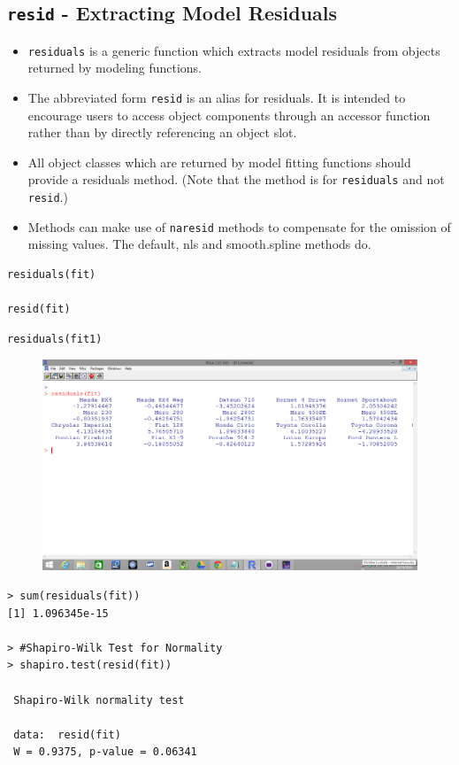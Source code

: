 \documentclass[residuals.tex]{subfiles}
\begin{document}
\Large
\newpage
\subsection{\texttt{resid} - Extracting Model Residuals}


\begin{itemize}
\item \texttt{residuals} is a generic function which extracts model residuals from objects returned by modeling functions. 

\item The abbreviated form \texttt{resid} is an alias for residuals. It is intended to encourage users to access object components through an accessor function rather than by directly referencing an object slot. 

\item All object classes which are returned by model fitting functions should provide a residuals method. (Note that the method is for \texttt{residuals} and not \texttt{resid}.) 

\item Methods can make use of \texttt{naresid} methods to compensate for the omission of missing values. The default, nls and smooth.spline methods do. 
\end{itemize}

\begin{framed}
\begin{verbatim}
residuals(fit)

resid(fit)
\end{verbatim}
\end{framed}
\begin{framed}
\begin{verbatim}
residuals(fit1)
\end{verbatim}
\end{framed}
\begin{figure}[h!]
\centering
\includegraphics[width=0.9\linewidth]{screenshot1}
\caption{}
\label{fig:screenshot1}
\end{figure}
\begin{verbatim}
> sum(residuals(fit))
[1] 1.096345e-15

> #Shapiro-Wilk Test for Normality
> shapiro.test(resid(fit))
 
 Shapiro-Wilk normality test
 
 data:  resid(fit)
 W = 0.9375, p-value = 0.06341
 
 
\end{verbatim}
\end{document}
